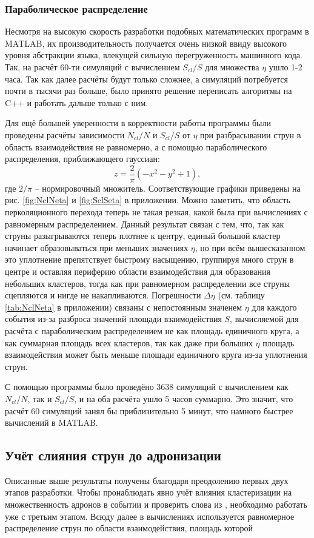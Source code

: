 \subsubsection{Параболическое распределение}
Несмотря на высокую скорость разработки подобных математических программ в MATLAB, их производительность получается очень низкой ввиду высокого уровня абстракции языка, влекущей сильную перегруженность машинного кода. Так, на расчёт 60-ти симуляций с вычислением $S_{cl}/S$ для множества $\eta$ ушло 1-2 часа. Так как далее расчёты будут только сложнее, а симуляций потребуется почти в тысячи раз больше, было принято решение переписать алгоритмы на C++ и работать дальше только с ним.

Для ещё большей уверенности в корректности работы программы были проведены расчёты зависимости $N_{cl}/N$ и $S_{cl}/S$ от $\eta$ при разбрасывании струн в область взаимодействия не равномерно, а с помощью параболического распределения, приближающего гауссиан:
\begin{equation} \label{eq:parab}
	z = \frac{2}{\pi} (-x^2 - y^2 + 1),
\end{equation}
где $2/\pi$ -- нормировочный множитель.  Соответствующие графики приведены на рис. \ref{fig:NclNeta} и \ref{fig:SclSeta} в приложении. 
Можно заметить, что область перколяционного перехода теперь не такая резкая, какой была при вычислениях с равномерным распределением. 
Данный результат связан с тем, что, так как струны разыгрываются теперь плотнее к центру, единый большой кластер начинает образовываться при меньших значениях $\eta$, но при всём вышесказанном это уплотнение препятствует быстрому насыщению, группируя много струн в центре и оставляя периферию области взаимодействия для образования небольших кластеров, тогда как при равномерном распределении все струны сцепляются и нигде не накапливаются.
Погрешности $\Delta \eta$ (см. таблицу \ref{tab:NclNeta} в приложении) связаны с непостоянным значенем $\eta$ для каждого события из-за разброса значений площади взаимодействия $S$, вычисляемой для расчёта с параболическим распределением не как площадь единичного круга, а как суммарная площадь всех кластеров, так как даже при больших $\eta$ площадь взаимодействия может быть меньше площади единичного круга из-за уплотнения струн.

С помощью программы было проведёно 3638 симуляций с вычислением как $N_{cl}/N$, так и $S_{cl}/S$, и на оба расчёта ушло 5 часов суммарно. Это значит, что расчёт 60 симуляций занял бы приблизительно 5 минут, что намного быстрее вычислений в MATLAB. 
\subsection{Учёт слияния струн до адронизации}
Описанные выше результаты получены благодаря преодолению первых двух этапов разработки. Чтобы пронаблюдать явно учёт влияния кластеризации на множественность адронов в событии и проверить слова из \cite{MulReduction}, необходимо работать уже с третьим этапом. Всюду далее в вычислениях используется равномерное распределение струн по области взаимодействия, площадь которой 

